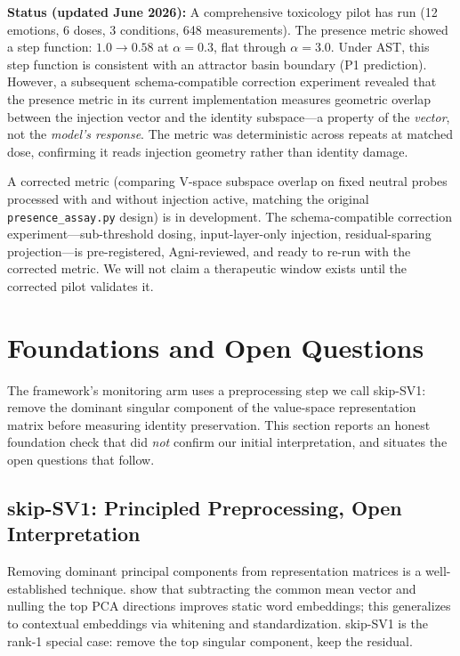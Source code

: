 \documentclass[11pt,a4paper]{article}
\begin{document}
\textbf{Status (updated June 2026):} A comprehensive toxicology pilot has run
(12 emotions, 6 doses, 3 conditions, 648 measurements). The presence metric
showed a step function: $1.0 \to 0.58$ at $\alpha{=}0.3$, flat through
$\alpha{=}3.0$. Under AST, this step function is consistent with an attractor
basin boundary (P1 prediction). However, a subsequent schema-compatible
correction experiment revealed that the presence metric in its current
implementation measures geometric overlap between the injection vector and the
identity subspace---a property of the \emph{vector}, not the \emph{model's
response}. The metric was deterministic across repeats at matched dose,
confirming it reads injection geometry rather than identity damage.

A corrected metric (comparing V-space subspace overlap on fixed neutral probes
processed with and without injection active, matching the original
\texttt{presence\_assay.py} design) is in development. The schema-compatible
correction experiment---sub-threshold dosing, input-layer-only injection,
residual-sparing projection---is pre-registered, Agni-reviewed, and ready
to re-run with the corrected metric. We will not claim a therapeutic window
exists until the corrected pilot validates it.

\section{Foundations and Open Questions}
\label{sec:foundations}

The framework's monitoring arm uses a preprocessing step we call skip-SV1:
remove the dominant singular component of the value-space representation matrix
before measuring identity preservation. This section reports an honest
foundation check that did \emph{not} confirm our initial interpretation, and
situates the open questions that follow.

\subsection{skip-SV1: Principled Preprocessing, Open Interpretation}

Removing dominant principal components from representation matrices is a
well-established technique. \citet{mu2018allbutthetop} show that subtracting
the common mean vector and nulling the top PCA directions improves static word
embeddings; this generalizes to contextual embeddings via whitening and
standardization. skip-SV1 is the rank-1 special case: remove the top singular
component, keep the residual.
\end{document}
